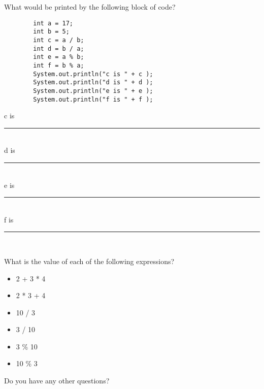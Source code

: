 \documentclass[letterpaper,12pt]{exam}
\begin{document}
\begin{questions}
\begin{samepage}
	\question What would be printed by the following block of code?
	\begin{verbatim}
		int a = 17;
		int b = 5;
		int c = a / b;
		int d = b / a;
		int e = a % b;
		int f = b % a;
		System.out.println("c is " + c );
		System.out.println("d is " + d );
		System.out.println("e is " + e );
		System.out.println("f is " + f );
	\end{verbatim}

	\noindent c is \rule{20mm}{0.15mm}\\
	\noindent d is \rule{20mm}{0.15mm}\\
	\noindent e is \rule{20mm}{0.15mm}\\
	\noindent f is \rule{20mm}{0.15mm}\\
	
	\begin{samepage}
		\question What is the value of each of the following expressions?
		  \begin{itemize}
			\item 2 + 3 * 4
			\item 2 * 3 + 4
			\item 10 / 3
			\item 3 / 10
			\item 3 \% 10
			\item 10 \% 3			
		   \end{itemize}
	\end{samepage}
\end{samepage}




\begin{samepage}
	\question Do you have any other questions?
	\vspace{30mm}
\end{samepage}

\end{questions}
\end{document}
